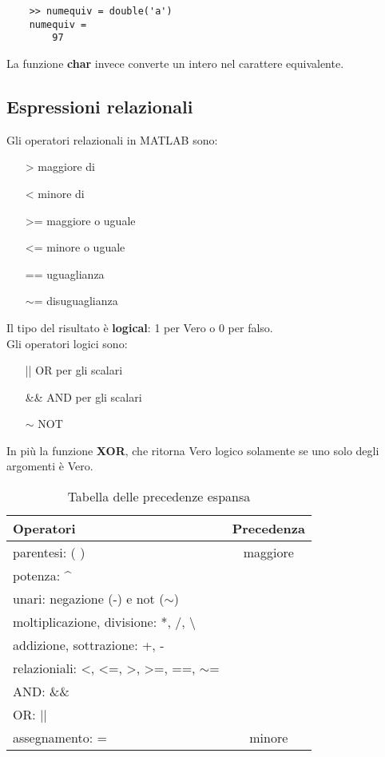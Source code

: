 \documentclass[a4paper, 10pt]{article}
\begin{document}
	\begin{lstlisting}
	>> numequiv = double('a')
	numequiv =
		97
	\end{lstlisting}
La funzione \textbf{char} invece converte un intero nel carattere equivalente.


\subsection{Espressioni relazionali}

Gli operatori relazionali in MATLAB sono:

\begin{itemize}
\item[>] maggiore di
\item[<] minore di
\item[>=] maggiore o uguale
\item[<=] minore o uguale
\item[==] uguaglianza
\item[$\sim$=] disuguaglianza
\end{itemize}
Il tipo del risultato è \textbf{logical}: 1 per Vero o 0 per falso. \\
Gli operatori logici sono:
\begin{itemize}
\item[||] OR per gli scalari
\item[\&\&] AND per gli scalari
\item[$\sim$] NOT
\end{itemize}
In più la funzione \textbf{XOR}, che ritorna Vero logico solamente se uno solo degli argomenti è Vero.\\


\begin{table}[!h]
	\centering
	\begin{tabular}{l|c}
		\toprule 
		Operatori & Precedenza \\
		\midrule
		parentesi: ( ) & maggiore \\
		potenza: \^ & \\
		unari: negazione (-) e not ($\sim$) \\
		moltiplicazione, divisione: *, /, \textbackslash \\
		addizione, sottrazione: +, - \\
		relazioniali: <, <=, >, >=, ==, $\sim$= \\
		AND: \&\& \\
		OR: || \\
		assegnamento: = & minore \\
		\bottomrule	
	\end{tabular}
\caption{Tabella delle precedenze espansa}
\end{table}
\end{document}
